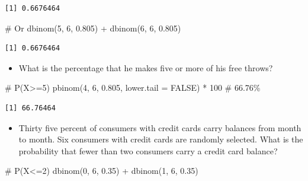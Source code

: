 \documentclass[
  letterpaper,
  DIV=11,
  numbers=noendperiod]{scrreprt}
\newenvironment{Shaded}{\begin{snugshade}}{\end{snugshade}}
\newcommand{\AttributeTok}[1]{\textcolor[rgb]{0.40,0.45,0.13}{#1}}
\newcommand{\CommentTok}[1]{\textcolor[rgb]{0.37,0.37,0.37}{#1}}
\newcommand{\ConstantTok}[1]{\textcolor[rgb]{0.56,0.35,0.01}{#1}}
\newcommand{\DecValTok}[1]{\textcolor[rgb]{0.68,0.00,0.00}{#1}}
\newcommand{\FloatTok}[1]{\textcolor[rgb]{0.68,0.00,0.00}{#1}}
\newcommand{\FunctionTok}[1]{\textcolor[rgb]{0.28,0.35,0.67}{#1}}
\newcommand{\NormalTok}[1]{\textcolor[rgb]{0.00,0.23,0.31}{#1}}
\newcommand{\SpecialCharTok}[1]{\textcolor[rgb]{0.37,0.37,0.37}{#1}}
\providecommand{\tightlist}{%
  \setlength{\itemsep}{0pt}\setlength{\parskip}{0pt}}\usepackage{longtable,booktabs,array}
\begin{document}
\begin{verbatim}
[1] 0.6676464
\end{verbatim}

\begin{Shaded}
\begin{Highlighting}[]
\CommentTok{\# Or}
\FunctionTok{dbinom}\NormalTok{(}\DecValTok{5}\NormalTok{, }\DecValTok{6}\NormalTok{, }\FloatTok{0.805}\NormalTok{) }\SpecialCharTok{+} \FunctionTok{dbinom}\NormalTok{(}\DecValTok{6}\NormalTok{, }\DecValTok{6}\NormalTok{, }\FloatTok{0.805}\NormalTok{)}
\end{Highlighting}
\end{Shaded}

\begin{verbatim}
[1] 0.6676464
\end{verbatim}

\begin{itemize}
\tightlist
\item
  What is the percentage that he makes five or more of his free throws?
\end{itemize}

\begin{Shaded}
\begin{Highlighting}[]
\CommentTok{\# P(X\textgreater{}=5)}
\FunctionTok{pbinom}\NormalTok{(}\DecValTok{4}\NormalTok{, }\DecValTok{6}\NormalTok{, }\FloatTok{0.805}\NormalTok{, }\AttributeTok{lower.tail =} \ConstantTok{FALSE}\NormalTok{) }\SpecialCharTok{*} \DecValTok{100}  \CommentTok{\# 66.76\%}
\end{Highlighting}
\end{Shaded}

\begin{verbatim}
[1] 66.76464
\end{verbatim}

\begin{itemize}
\tightlist
\item
  Thirty five percent of consumers with credit cards carry balances from
  month to month. Six consumers with credit cards are randomly selected.
  What is the probability that fewer than two consumers carry a credit
  card balance?
\end{itemize}

\begin{Shaded}
\begin{Highlighting}[]
\CommentTok{\# P(X\textless{}=2)}
\FunctionTok{dbinom}\NormalTok{(}\DecValTok{0}\NormalTok{, }\DecValTok{6}\NormalTok{, }\FloatTok{0.35}\NormalTok{) }\SpecialCharTok{+} \FunctionTok{dbinom}\NormalTok{(}\DecValTok{1}\NormalTok{, }\DecValTok{6}\NormalTok{, }\FloatTok{0.35}\NormalTok{)}
\end{Highlighting}
\end{Shaded}
\end{document}
